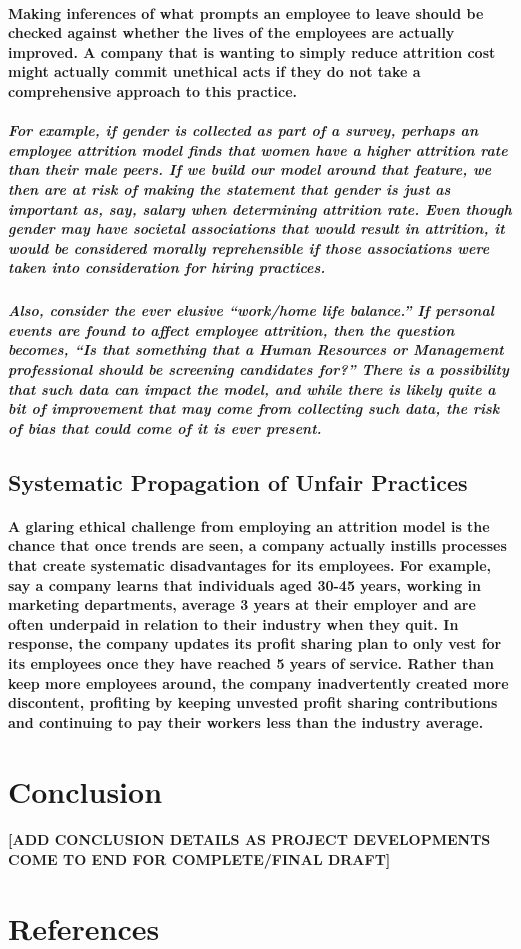 \documentclass{article}
\begin{document}
\paragraph{Making inferences of what prompts an employee to leave should be checked against whether the lives of the employees are actually improved. A company that is wanting to simply reduce attrition cost might actually commit unethical acts if they do not take a comprehensive approach to this practice.}

\subparagraph{For example, if gender is collected as part of a survey, perhaps an employee attrition model finds that women have a higher attrition rate than their male peers. If we build our model around that feature, we then are at risk of making the statement that gender is just as important as, say, salary when determining attrition rate. Even though gender may have societal associations that would result in attrition, it would be considered morally reprehensible if those associations were taken into consideration for hiring practices.}
 
\subparagraph{Also, consider the ever elusive “work/home life balance.” If personal events are found to affect employee attrition, then the question becomes, “Is that something that a Human Resources or Management professional should be screening candidates for?” There is a possibility that such data can impact the model, and while there is likely quite a bit of improvement that may come from collecting such data, the risk of bias that could come of it is ever present.}
 
\subsection{Systematic Propagation of Unfair Practices}

\paragraph{A glaring ethical challenge from employing an attrition model is the chance that once trends are seen, a company actually instills processes that create systematic disadvantages for its employees. For example, say a company learns that individuals aged 30-45 years, working in marketing departments, average 3 years at their employer and are often underpaid in relation to their industry when they quit. In response, the company updates its profit sharing plan to only vest for its employees once they have reached 5 years of service. Rather than keep more employees around, the company inadvertently created more discontent, profiting by keeping unvested profit sharing contributions and continuing to pay their workers less than the industry average.}

\section{Conclusion}

\paragraph{[ADD CONCLUSION DETAILS AS PROJECT DEVELOPMENTS COME TO END FOR COMPLETE/FINAL DRAFT]}
 
\section{References}

\printbibliography
\end{document}
